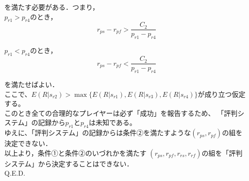 を満たす必要がある．つまり，\\

$p_{r1} > p_{r4}$のとき， 
\begin{equation}
  r_{ps} - r_{pf} > \frac{ C_2 }{p_{r1} - p_{r4}}
\end{equation}

$p_{r1} < p_{r4}$のとき，
\begin{equation}
  r_{ps} - r_{pf} < \frac{ C_2 }{p_{r1} - p_{r4}}
\end{equation}

を満たせばよい．\\

ここで、$E(R|s_{r2})>\max\{E(R|s_{r1}), E(R|s_{r3}), E(R|s_{r4}) \}$が成り立つ仮定する。\\

このとき全ての合理的なプレイヤーは必ず「成功」を報告するため、
「評判システム」の記録から$p_{r1}$と$p_{r4}$は未知である。\\

ゆえに、「評判システム」の記録からは条件②を満たすような$(r_{ps}, r_{pf})$の組を決定できない．\\

以上より，条件①と条件②のいづれかを満たす
$(r_{ps}, r_{pf},r_{rs},r_{rf})$の組を「評判システム」から決定することはできない．\\

Q.E.D.


